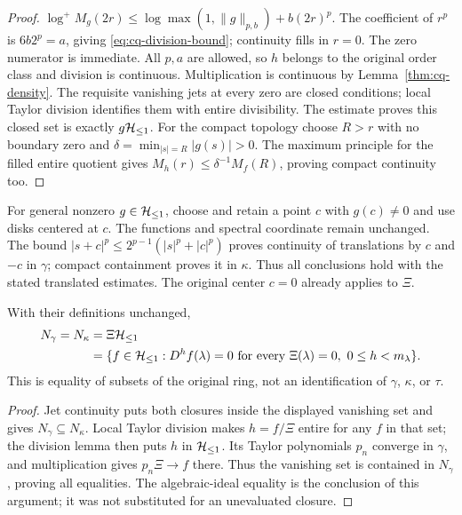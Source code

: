 \begin{proof}
$\log^+M_g(2r)\leq\log\max(1,\|g\|_{p,b})+b(2r)^p$.
The coefficient of $r^p$ is $6b2^p=a$, giving
\eqref{eq:cq-division-bound}; continuity fills in $r=0$.
The zero numerator is immediate. All $p,a$ are allowed, so $h$
belongs to the original order class and division is continuous.
Multiplication is continuous by Lemma~\ref{thm:cq-density}.
The requisite vanishing jets at every zero are closed conditions;
local Taylor division identifies them with entire divisibility.
The estimate proves this closed set is exactly $g\mathcal H_{\leq 1}$.
For the compact topology choose $R>r$ with no boundary zero and
$\delta=\min_{|s|=R}|g(s)|>0$. The maximum principle for the filled
entire quotient gives $M_h(r)\leq\delta^{-1}M_f(R)$, proving
compact continuity too.
\end{proof}

For general nonzero $g\in\mathcal H_{\leq 1}$, choose and retain a point $c$ with
$g(c)\ne0$ and use disks centered at $c$. The functions and spectral
coordinate remain unchanged. The bound
$|s+c|^p\leq2^{p-1}(|s|^p+|c|^p)$ proves continuity of translations
by $c$ and $-c$ in $\gamma$; compact containment proves it in
$\kappa$. Thus all conclusions hold with the stated translated
estimates. The original center $c=0$ already applies to $\Xi$.

\begin{cqproposition}
\label{thm:cq-equalclosures}
With their definitions unchanged,
\begin{equation}\label{eq:cq-equalclosures}
 \begin{aligned}
 N_\gamma=N_\kappa&=\Xi\mathcal H_{\leq 1}\\
 &=\{f\in\mathcal H_{\leq 1}:D^hf(\lambda)=0\text{ for every }\Xi(\lambda)=0,
                                      \ 0\leq h<m_\lambda\}.
 \end{aligned}
\end{equation}
This is equality of subsets of the original ring, not an
identification of $\gamma$, $\kappa$, or $\tau$.
\end{cqproposition}
\begin{proof}
Jet continuity puts both closures inside the displayed vanishing
set and gives $N_\gamma\subseteq N_\kappa$. Local Taylor division
makes $h=f/\Xi$ entire for any $f$ in that set; the division lemma
then puts $h$ in $\mathcal H_{\leq 1}$. Its Taylor polynomials $p_n$ converge in
$\gamma$, and multiplication gives $p_n\Xi\to f$ there. Thus the
vanishing set is contained in $N_\gamma$, proving all equalities.
The algebraic-ideal equality is the conclusion of this argument;
it was not substituted for an unevaluated closure.
\end{proof}

